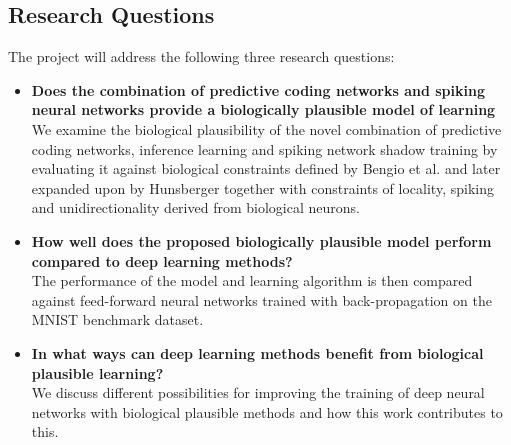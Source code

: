 \documentclass[a4paper,11pt]{article} %
\begin{document}
\subsection{Research Questions}
The project will address the following three research questions:
\begin{itemize}
  \item \textbf{Does the combination of predictive coding networks and spiking neural networks provide a biologically plausible model of learning} \vspace{5pt} \\ 
  We examine the biological plausibility of the novel combination of predictive coding networks, inference learning and spiking network shadow training by evaluating it against biological constraints defined by Bengio et al. \cite{BengioLBL15} and later expanded upon by Hunsberger \cite{Eric2018} together with constraints of locality, spiking and unidirectionality derived from biological neurons. 

  \item \textbf{How well does the proposed biologically plausible model perform compared to deep learning methods?} \vspace{5pt} \\
  The performance of the model and learning algorithm is then compared against feed-forward neural networks trained with back-propagation on the MNIST benchmark dataset.

  \item \textbf{In what ways can deep learning methods benefit from biological plausible learning?} \vspace{5pt} \\
  We discuss different possibilities for improving the training of deep neural networks with biological plausible methods and how this work contributes to this. %
\end{itemize}
\end{document}
